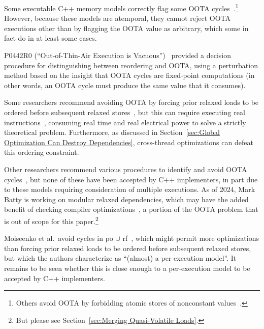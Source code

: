 Some executable C++ memory models correctly flag some OOTA
cycles~\cite{JadeAlglave2014HerdingCats}.\footnote{
	Others avoid OOTA by forbidding atomic stores of nonconstant
	values~\cite{MarkBatty2011cppmem}.}
However, because these models are atemporal, they cannot reject
OOTA executions other than by flagging the OOTA value as arbitrary,
which some in fact do in at least some cases.

P0442R0 (``Out-of-Thin-Air Execution is Vacuous'')~\cite{PaulEMcKenney2016OOTA}
provided a decision procedure for distinguishing between reordering and
OOTA, using a perturbation method based on the insight that OOTA cycles
are fixed-point computations
(in other words, an OOTA cycle must produce the same value that it consumes).

Some researchers recommend avoiding OOTA by forcing prior relaxed
loads to be ordered before subsequent relaxed
stores~\cite{Boehm:2014:OGA:2618128.2618134,HansBoehm2019OOTArevisitedAgain,Lahav:2017:RSC:3062341.3062352,PiezhaoOu2018OOTApapl,SungHwanLee2023WeakMemoryPromising},
but this can require executing real
instructions~\cite[Section 7.1]{Maranget2012TutorialARMPower},
consuming real time and real electrical power to solve a strictly
theoretical problem.
Furthermore, as discussed in
Section~\ref{sec:Global Optimization Can Destroy Dependencies},
cross-thread optimizations can defeat this ordering constraint.

Other researchers recommend various procedures to identify and avoid OOTA
cycles~\cite{Lahav:2017:RSC:3062341.3062352,Sinclair:2017:CAR:3079856.3080206,Lee:10.1145/3385412.3386010,MarkBatty2019ModularRelaxedDependenciesOOTA,MinkiCho2021PromisingSemantics,SohamChakraborty2019OOTAeventStructure,JeehoonKang2017PromisingSemantics,JeanPichonPharabod2016OOTA},
but none of these have been accepted by C++ implementers, in part due
to these models requiring consideration of multiple executions.
As of 2024, Mark Batty is working on modular relaxed dependencies,
which may have the added benefit of checking compiler
optimizations~\cite{JayRichards2024SymbolicMrder}, a portion
of the OOTA problem that is out of scope for this paper.\footnote{
	But please see Section~\ref{sec:Merging Quasi-Volatile Loads}.}

Moiseenko et al.~avoid cycles in po $\cup$
rf~\cite{EvgeniiMoiseenko2025reexecution}, which might permit
more optimizations than forcing prior relaxed loads to be ordered
before subsequent relaxed stores, but which the authors characterize
as ``(almost) a per-execution model''.
It remains to be seen whether this is close enough to a per-execution
model to be accepted by C++ implementers.

